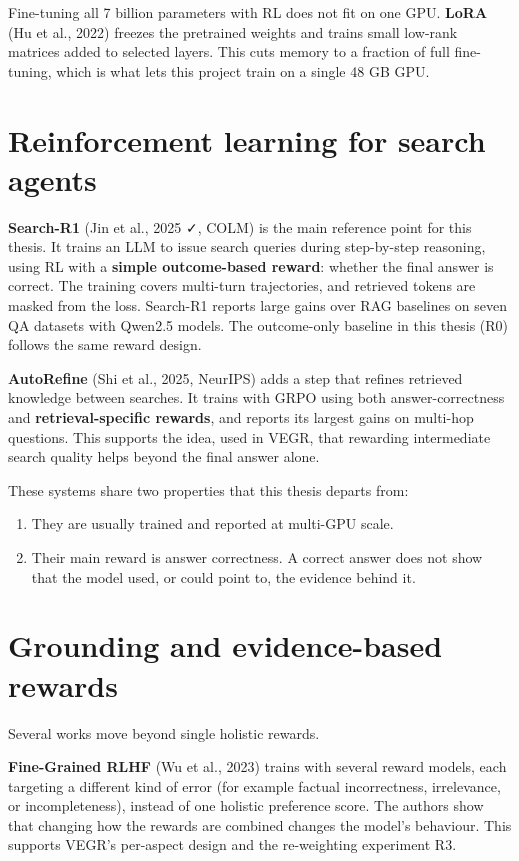 Fine-tuning all 7 billion parameters with RL does not fit on one GPU.
\textbf{LoRA} (Hu et al., 2022) freezes the pretrained weights and
trains small low-rank matrices added to selected layers. This cuts
memory to a fraction of full fine-tuning, which is what lets this
project train on a single 48 GB GPU.

\section{Reinforcement learning for search agents}\label{sec:2.6}

\textbf{Search-R1} (Jin et al., 2025 ✓, COLM) is the main reference
point for this thesis. It trains an LLM to issue search queries during
step-by-step reasoning, using RL with a \textbf{simple outcome-based
reward}: whether the final answer is correct. The training covers
multi-turn trajectories, and retrieved tokens are masked from the loss.
Search-R1 reports large gains over RAG baselines on seven QA datasets
with Qwen2.5 models. The outcome-only baseline in this thesis (R0)
follows the same reward design.

\textbf{AutoRefine} (Shi et al., 2025, NeurIPS) adds a step that refines
retrieved knowledge between searches. It trains with GRPO using both
answer-correctness and \textbf{retrieval-specific rewards}, and reports
its largest gains on multi-hop questions. This supports the idea, used
in VEGR, that rewarding intermediate search quality helps beyond the
final answer alone.

These systems share two properties that this thesis departs from:

\begin{enumerate}
\def\labelenumi{\arabic{enumi}.}
\tightlist
\item
  They are usually trained and reported at multi-GPU scale.
\item
  Their main reward is answer correctness. A correct answer does not
  show that the model used, or could point to, the evidence behind it.
\end{enumerate}

\section{Grounding and evidence-based rewards}\label{sec:2.7}

Several works move beyond single holistic rewards.

\textbf{Fine-Grained RLHF} (Wu et al., 2023) trains with several reward
models, each targeting a different kind of error (for example factual
incorrectness, irrelevance, or incompleteness), instead of one holistic
preference score. The authors show that changing how the rewards are
combined changes the model's behaviour. This supports VEGR's per-aspect
design and the re-weighting experiment R3.

